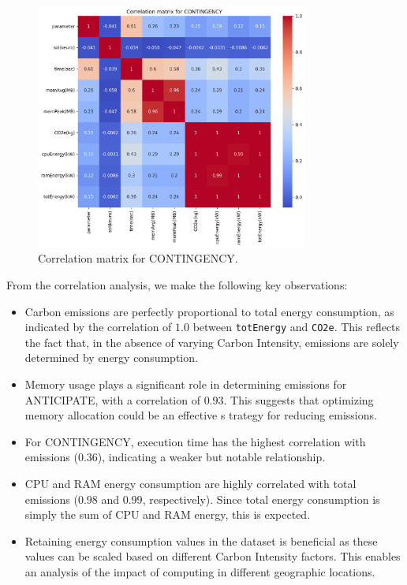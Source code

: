 \documentclass[a4paper,singleside,12pt]{report} %
\begin{document}
\begin{figure}[h!]
    \centering
    \includegraphics[width=0.8\textwidth]{imgs/cont_corr_mat.png}
    \caption{Correlation matrix for CONTINGENCY.}
    \label{fig:cont_corr_mat}
\end{figure}

From the correlation analysis, we make the following key observations:
\begin{itemize}
    \item Carbon emissions are perfectly proportional to total energy consumption, as indicated by the correlation of $1.0$ between \verb|totEnergy| and \verb|CO2e|. This reflects the fact 
    that, in the absence of varying Carbon Intensity, emissions are solely determined by energy consumption.
    \item Memory usage plays a significant role in determining emissions for ANTICIPATE, with a correlation of $0.93$. This suggests that optimizing memory allocation could be an effective s
    trategy for reducing emissions.
    \item For CONTINGENCY, execution time has the highest correlation with emissions ($0.36$), indicating a weaker but notable relationship.
    \item CPU and RAM energy consumption are highly correlated with total emissions ($0.98$ and $0.99$, respectively). Since total energy consumption is simply the sum of CPU and RAM energy, 
    this is expected.
    \item Retaining energy consumption values in the dataset is beneficial as these values can be scaled based on different Carbon Intensity factors. This enables an analysis of the impact 
    of computing in different geographic locations.
\end{itemize}
\end{document}

